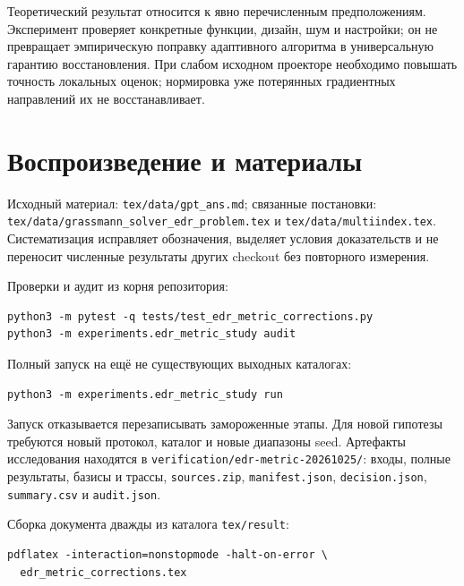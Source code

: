 \documentclass[11pt,a4paper]{article}
\newcommand{\code}[1]{\nolinkurl{#1}}
\begin{document}
Теоретический результат относится к явно перечисленным предположениям.
Эксперимент проверяет конкретные функции, дизайн, шум и настройки;
он не превращает эмпирическую поправку адаптивного алгоритма
в универсальную гарантию восстановления. При слабом исходном проекторе
необходимо повышать точность локальных оценок; нормировка уже
потерянных градиентных направлений их не восстанавливает.

\appendix
\section{Воспроизведение и материалы}
Исходный материал: \code{tex/data/gpt_ans.md}; связанные постановки:
\code{tex/data/grassmann_solver_edr_problem.tex} и
\code{tex/data/multiindex.tex}. Систематизация исправляет обозначения,
выделяет условия доказательств и не переносит численные результаты
других checkout без повторного измерения.

Проверки и аудит из корня репозитория:
\begin{verbatim}
python3 -m pytest -q tests/test_edr_metric_corrections.py
python3 -m experiments.edr_metric_study audit
\end{verbatim}
Полный запуск на ещё не существующих выходных каталогах:
\begin{verbatim}
python3 -m experiments.edr_metric_study run
\end{verbatim}
Запуск отказывается перезаписывать замороженные этапы. Для новой
гипотезы требуются новый протокол, каталог и новые диапазоны seed.
Артефакты исследования находятся в
\code{verification/edr-metric-20261025/}: входы, полные результаты,
базисы и трассы, \code{sources.zip}, \code{manifest.json},
\code{decision.json}, \code{summary.csv} и \code{audit.json}.

Сборка документа дважды из каталога \code{tex/result}:
\begin{verbatim}
pdflatex -interaction=nonstopmode -halt-on-error \
  edr_metric_corrections.tex
\end{verbatim}
\end{document}
